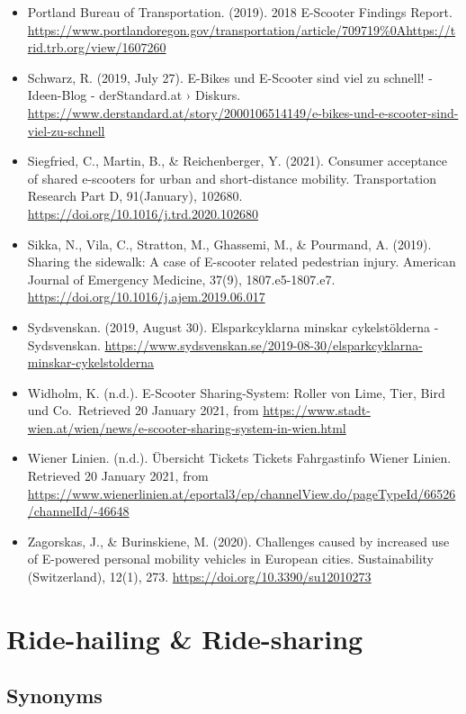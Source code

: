 \documentclass[
]{book}
\begin{document}
\begin{itemize}
\item
  Portland Bureau of Transportation. (2019). 2018 E-Scooter Findings Report. \url{https://www.portlandoregon.gov/transportation/article/709719\%0Ahttps://trid.trb.org/view/1607260}
\item
  Schwarz, R. (2019, July 27). E-Bikes und E-Scooter sind viel zu schnell! - Ideen-Blog - derStandard.at › Diskurs. \url{https://www.derstandard.at/story/2000106514149/e-bikes-und-e-scooter-sind-viel-zu-schnell}
\item
  Siegfried, C., Martin, B., \& Reichenberger, Y. (2021). Consumer acceptance of shared e-scooters for urban and short-distance mobility. Transportation Research Part D, 91(January), 102680. \url{https://doi.org/10.1016/j.trd.2020.102680}
\item
  Sikka, N., Vila, C., Stratton, M., Ghassemi, M., \& Pourmand, A. (2019). Sharing the sidewalk: A case of E-scooter related pedestrian injury. American Journal of Emergency Medicine, 37(9), 1807.e5-1807.e7. \url{https://doi.org/10.1016/j.ajem.2019.06.017}
\item
  Sydsvenskan. (2019, August 30). Elsparkcyklarna minskar cykelstölderna - Sydsvenskan. \url{https://www.sydsvenskan.se/2019-08-30/elsparkcyklarna-minskar-cykelstolderna}
\item
  Widholm, K. (n.d.). E-Scooter Sharing-System: Roller von Lime, Tier, Bird und Co.~Retrieved 20 January 2021, from \url{https://www.stadt-wien.at/wien/news/e-scooter-sharing-system-in-wien.html}
\item
  Wiener Linien. (n.d.). Übersicht Tickets \textbar{} Tickets \textbar{} Fahrgastinfo \textbar{} Wiener Linien. Retrieved 20 January 2021, from \url{https://www.wienerlinien.at/eportal3/ep/channelView.do/pageTypeId/66526/channelId/-46648}
\item
  Zagorskas, J., \& Burinskiene, M. (2020). Challenges caused by increased use of E-powered personal mobility vehicles in European cities. Sustainability (Switzerland), 12(1), 273. \url{https://doi.org/10.3390/su12010273}
\end{itemize}

\hypertarget{ride_hailing}{%
\section{Ride-hailing \& Ride-sharing}\label{ride_hailing}}

\hypertarget{synonyms-42}{%
\subsection*{Synonyms}\label{synonyms-42}}
\end{document}
